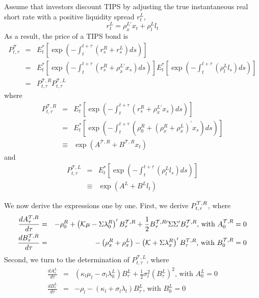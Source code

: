\documentclass{article}
\begin{document}
Assume that investors discount TIPS by adjusting the true instantaneous real
short rate with a positive liquidity spread $r_{t}^{L}$,%
\begin{equation*}
r_{t}^{L}=\rho _{x}^{L\prime }x_{t}+\rho _{l}^{L}l_{t}
\end{equation*}%
As a result, the price of a TIPS bond is%
\begin{eqnarray*}
P_{t,\tau }^{\mathcal{T}} &=&E_{t}^{\ast }\left[ \exp \left(
-\int_{t}^{t+\tau }\left( r_{s}^{R}+r_{s}^{L}\right) ds\right) \right]  \\
&=&E_{t}^{\ast }\left[ \exp \left( -\int_{t}^{t+\tau }\left( r_{s}^{R}+\rho
_{x}^{L\prime }x_{s}\right) ds\right) \right] E_{t}^{\ast }\left[ \exp
\left( -\int_{t}^{t+\tau }\left( \rho _{l}^{L}l_{s}\right) ds\right) \right] 
\\
&=&P_{t,\tau }^{\mathcal{T},R}P_{t,\tau }^{\mathcal{T},L}
\end{eqnarray*}%
where%
\begin{eqnarray*}
P_{t,\tau }^{\mathcal{T},R} &=&E_{t}^{\ast }\left[ \exp \left(
-\int_{t}^{t+\tau }\left( r_{s}^{R}+\rho _{x}^{L\prime }x_{s}\right)
ds\right) \right]  \\
&=&E_{t}^{\ast }\left[ \exp \left( -\int_{t}^{t+\tau }\left( \rho
_{0}^{R}+\left( \rho _{x}^{R}+\rho _{x}^{L}\right) ^{\prime }x_{s}\right)
ds\right) \right]  \\
&\equiv &\exp \left( A^{\mathcal{T},R}+B^{\mathcal{T},R}x_{t}\right) 
\end{eqnarray*}%
and%
\begin{eqnarray*}
P_{t,\tau }^{\mathcal{T},L} &=&E_{t}^{\ast }\left[ \exp \left(
-\int_{t}^{t+\tau }\left( \rho _{l}^{L}l_{s}\right) ds\right) \right]  \\
&\equiv &\exp \left( A^{L}+B^{L}l_{t}\right) 
\end{eqnarray*}

We now derive the expressions one by one. First, we derive $P_{t,\tau }^{%
\mathcal{T},R}$, where  
\begin{eqnarray*}
\frac{dA_{\tau }^{\mathcal{T},R}}{d\tau } &=&-\rho _{0}^{R}+\left( \mathcal{%
K\mu }-\Sigma \lambda _{0}^{R}\right) ^{\prime }B_{\tau }^{\mathcal{T},R}+%
\frac{1}{2}B_{\tau }^{\mathcal{T},R\prime }\Sigma \Sigma ^{\prime }B_{\tau
}^{\mathcal{T},R}\text{, with }A_{0}^{\mathcal{T},R}=0 \\
\frac{dB_{\tau }^{\mathcal{T},R}}{d\tau } &=&-\left( \rho _{x}^{R}+\rho
_{x}^{L}\right) -\left( \mathcal{K}+\Sigma \lambda _{x}^{R}\right) ^{\prime
}B_{\tau }^{\mathcal{T},R}\text{, with }B_{0}^{\mathcal{T},R}=0
\end{eqnarray*}%
Second, we turn to the determination of $P_{t,\tau }^{\mathcal{T},L}$, where
\begin{eqnarray*}
\frac{dA_{\tau }^{L}}{d\tau } &=&\left( \kappa _{l}\mu _{l}-\sigma
_{l}\lambda _{0}^{L}\right) B_{\tau }^{L}+\frac{1}{2}\sigma _{l}^{2}\left(
B_{\tau }^{L}\right) ^{2}\text{, with }A_{0}^{L}=0 \\
\frac{dB_{\tau }^{L}}{d\tau } &=&-\rho _{l}-\left( \kappa _{l}+\sigma
_{l}\lambda _{l}\right) B_{\tau }^{L}\text{, with }B_{0}^{L}=0
\end{eqnarray*}
\end{document}
